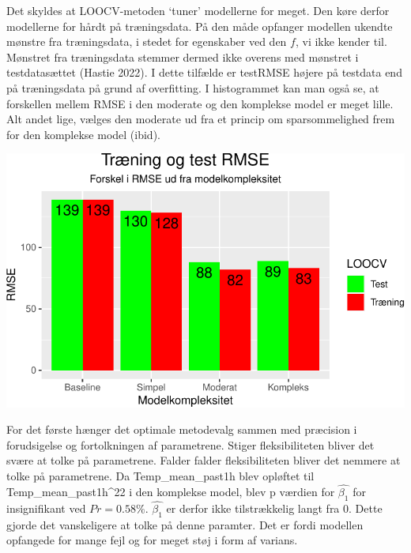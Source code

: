 \documentclass[
  12pt,
  a4paper,
  DIV=11,
  numbers=noendperiod]{scrartcl}
\begin{document}
Det skyldes at LOOCV-metoden `tuner' modellerne for meget. Den køre
derfor modellerne for hårdt på træningsdata. På den måde opfanger
modellen ukendte mønstre fra træningsdata, i stedet for egenskaber ved
den \(f\), vi ikke kender til. Mønstret fra træningsdata stemmer dermed
ikke overens med mønstret i testdatasættet (Hastie 2022). I dette
tilfælde er testRMSE højere på testdata end på træningsdata på grund af
overfitting. I histogrammet kan man også se, at forskellen mellem RMSE i
den moderate og den komplekse model er meget lille. Alt andet lige,
vælges den moderate ud fra et princip om sparsommelighed frem for den
komplekse model (ibid).

\includegraphics{Semester_projekt_2022_G1_files/figure-pdf/Chunk 15 - Histgram over MSE-1.pdf}

For det første hænger det optimale metodevalg sammen med præcision i
forudsigelse og fortolkningen af parametrene. Stiger fleksibiliteten
bliver det svære at tolke på parametrene. Falder falder fleksibiliteten
bliver det nemmere at tolke på parametrene. Da Temp\_mean\_past1h blev
opløftet til Temp\_mean\_past1h\^{}22 i den komplekse model, blev p
værdien for \(\hat{\beta_1}\) for insignifikant ved \(Pr = 0.58\%\).
\(\hat{\beta_1}\) er derfor ikke tilstrækkelig langt fra \(0\). Dette
gjorde det vanskeligere at tolke på denne paramter. Det er fordi
modellen opfangede for mange fejl og for meget støj i form af varians.
\end{document}
